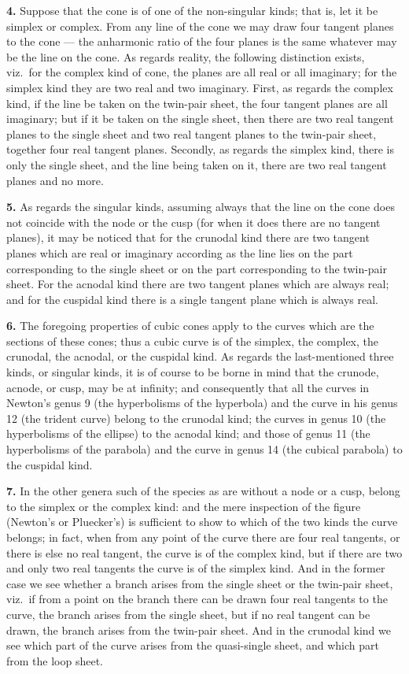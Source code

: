 \documentclass[11pt,a4paper]{article}
\theoremstyle{plain}
\begin{document}
\noindent\textbf{4.} Suppose that the cone is of one of the non-singular kinds; that is, let it be simplex or complex. From any line of the cone we may draw four tangent planes to the cone --- the anharmonic ratio of the four planes is the same whatever may be the line on the cone. As regards reality, the following distinction exists, viz.\ for the complex kind of cone, the planes are all real or all imaginary; for the simplex kind they are two real and two imaginary. First, as regards the complex kind, if the line be taken on the twin-pair sheet, the four tangent planes are all imaginary; but if it be taken on the single sheet, then there are two real tangent planes to the single sheet and two real tangent planes to the twin-pair sheet, together four real tangent planes. Secondly, as regards the simplex kind, there is only the single sheet, and the line being taken on it, there are two real tangent planes and no more.

\noindent\textbf{5.} As regards the singular kinds, assuming always that the line on the cone does not coincide with the node or the cusp (for when it does there are no tangent planes), it may be noticed that for the crunodal kind there are two tangent planes which are real or imaginary according as the line lies on the part corresponding to the single sheet or on the part corresponding to the twin-pair sheet. For the acnodal kind there are two tangent planes which are always real; and for the cuspidal kind there is a single tangent plane which is always real.

\noindent\textbf{6.} The foregoing properties of cubic cones apply to the curves which are the sections of these cones; thus a cubic curve is of the simplex, the complex, the crunodal, the acnodal, or the cuspidal kind. As regards the last-mentioned three kinds, or singular kinds, it is of course to be borne in mind that the crunode, acnode, or cusp, may be at infinity; and consequently that all the curves in Newton's genus 9 (the hyperbolisms of the hyperbola) and the curve in his genus 12 (the trident curve) belong to the crunodal kind; the curves in genus 10 (the hyperbolisms of the ellipse) to the acnodal kind; and those of genus 11 (the hyperbolisms of the parabola) and the curve in genus 14 (the cubical parabola) to the cuspidal kind.

\noindent\textbf{7.} In the other genera such of the species as are without a node or a cusp, belong to the simplex or the complex kind: and the mere inspection of the figure (Newton's or Pluecker's) is sufficient to show to which of the two kinds the curve belongs; in fact, when from any point of the curve there are four real tangents, or there is else no real tangent, the curve is of the complex kind, but if there are two and only two real tangents the curve is of the simplex kind. And in the former case we see whether a branch arises from the single sheet or the twin-pair sheet, viz.\ if from a point on the branch there can be drawn four real tangents to the curve, the branch arises from the single sheet, but if no real tangent can be drawn, the branch arises from the twin-pair sheet. And in the crunodal kind we see which part of the curve arises from the quasi-single sheet, and which part from the loop sheet.
\end{document}
